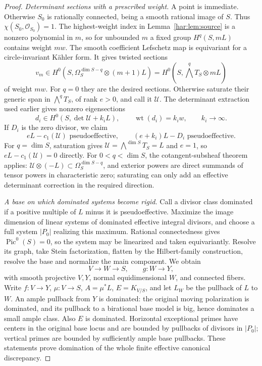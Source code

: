 \begin{proof}
\smallskip\noindent\textit{Determinant sections with a prescribed weight.}
A point is immediate. Otherwise \(S_0\) is rationally connected,
being a smooth rational image of \(S\). Thus
\(\chi(S_0,\mathcal O_{S_0})=1\). The highest-weight index in
Lemma~\ref{har:lem:source} is a nonzero polynomial in \(m\), so for
unbounded \(m\) a fixed group \(H^q(S,mL)\) contains weight \(mw\).
The smooth coefficient Lefschetz map is equivariant for a
circle-invariant Kähler form. It gives twisted sections
\[
 v_m\in H^0(S,\Omega_S^{\dim S-q}\otimes(m+1)L)
      =H^0(S,\bigwedge^q T_S\otimes mL)
\]
of weight \(mw\). For \(q=0\) they are the desired sections. Otherwise
saturate their generic span in \(\bigwedge^qT_S\), of rank \(e>0\),
and call it \(\mathcal U\). The determinant extraction used earlier
gives nonzero eigensections
\begin{equation}\label{har:eq:detweights}
 d_i\in H^0(S,\det\mathcal U+k_iL),\qquad
 \operatorname{wt}(d_i)=k_iw,\qquad k_i\to\infty.
\end{equation}
If \(D_i\) is the zero divisor, we claim
\[
 eL-c_1(\mathcal U)\text{ pseudoeffective},\qquad
 (e+k_i)L-D_i\text{ pseudoeffective}.
\]
For $q=\dim S$, saturation gives $\mathcal U=\bigwedge^{\dim S}T_S=L$ and $e=1$, so $eL-c_1(\mathcal U)=0$ directly. For $0<q<\dim S$, the cotangent-subsheaf theorem \cite[Theorem~4.1]{LMPTX2023} applies: \(\mathcal U\otimes(-L)\subset\Omega_S^{\dim S-q}\), and
exterior powers are direct summands of tensor powers in characteristic
zero; saturating can only add an effective determinant correction
in the required direction.

\smallskip\noindent\textit{A base on which dominated systems become rigid.}
Call a divisor class dominated if a positive multiple of \(L\) minus
it is pseudoeffective. Maximize the image dimension of linear systems
of dominated effective integral divisors, and choose a full system
\(|P_0|\) realizing this maximum. Rational connectedness gives
\(\operatorname{Pic}^0(S)=0\), so the system may be linearized and
taken equivariantly. Resolve its graph, take Stein factorization,
flatten by the Hilbert-family construction, resolve the base and
normalize the main component. We obtain
\[
 V\longrightarrow W\longrightarrow S,\qquad g:W\to Y,
\]
with smooth projective \(V,Y\), normal equidimensional \(W\), and
connected fibers. Write \(f:V\to Y\), \(\mu:V\to S\),
\(A=\mu^*L\), \(E=K_{V/S}\), and let \(L_W\) be the pullback of \(L\) to \(W\). An ample pullback from \(Y\) is
dominated: the original moving polarization is dominated, and its
pullback to a birational base model is big, hence dominates a small
ample class. Also \(E\) is dominated. Horizontal exceptional primes
have centers in the original base locus and are bounded by pullbacks
of divisors in \(|P_0|\); vertical primes are bounded by sufficiently
ample base pullbacks. These statements prove domination of the whole
finite effective canonical discrepancy.


\end{proof}

